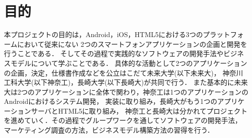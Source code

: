 \section{目的}
\par 本プロジェクトの目的は，Android，iOS，HTML5における3つのプラットフォームにおいて従来にない
2つのスマートフォンアプリケーションの企画と開発を行うことである．
そしてその過程で実践的なソフトウェアの開発手法やビジネスモデルについて学ぶことである．
具体的な活動として2つのアプリケーションの企画，決定，仕様書作成などを公立はこだて未来大学(以下未来大)，
神奈川工科大学(以下神奈工)，長崎大学(以下長崎大)が共同で行う．
また基本的に未来大は2つのアプリケーションに全体で関わり，神奈工は1つのアプリケーションのAndroidにおけるシステム開発，
実装に取り組み，長崎大がもう1つのアプリケーションサーバとHTML5に取り組み，
神奈工と長崎大は分かれてプロジェクトを進めていく．その過程でグループワークを通してソフトウェアの開発手法，
マーケティング調査の方法，ビジネスモデル構築方法の習得を行う．
